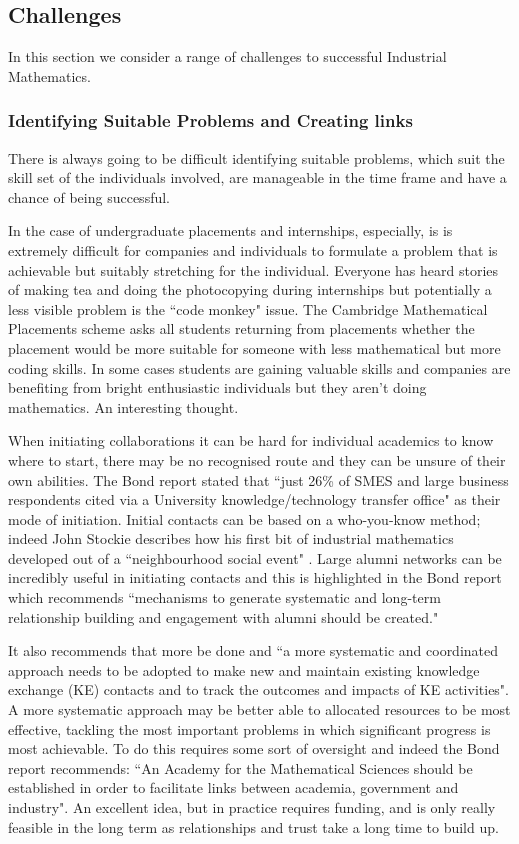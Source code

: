 \documentclass[11pt]{article} %
\begin{document}
	\subsection{Challenges \label{challenges}} 
	In this section we consider a range of challenges to successful Industrial Mathematics. 
	
	\subsubsection{Identifying Suitable Problems and Creating links} 
	
	There is always going to be difficult identifying suitable problems, which suit the skill set of the individuals involved, are manageable in the time frame and have a chance of being successful. 
	
	In the case of undergraduate placements and internships, especially,  is is extremely difficult for companies and individuals  to formulate a problem that is achievable but suitably stretching for the individual. Everyone has heard stories of making tea and doing the photocopying during internships but potentially a less visible problem is the ``code monkey" issue. The Cambridge Mathematical Placements scheme asks all students returning from placements whether the placement would be more suitable for someone with less mathematical but more coding skills. In some cases students are gaining valuable skills and companies are benefiting from bright enthusiastic individuals but they aren't doing mathematics. An interesting thought. 
	
	
	
	When initiating collaborations it can be hard for individual academics to know where to start, there may be  no recognised route and they can be  unsure of their own abilities.	The Bond report stated that ``just 26\% of SMES and large business respondents cited via a University knowledge/technology transfer office" as their mode of initiation. Initial contacts can be based on a who-you-know  method; indeed John Stockie describes how his first bit of industrial mathematics developed out of a  ``neighbourhood social event" \cite{Stockie2015}. Large alumni networks can be incredibly useful in initiating contacts and this is highlighted in the Bond report \cite{Bond}  which recommends ``mechanisms to generate systematic and long-term relationship building and engagement with alumni should be created."
	
	It also recommends that more be done  and ``a more systematic and coordinated approach needs to be adopted to make new and maintain existing knowledge exchange (KE) contacts and to track the outcomes and impacts of KE activities". A more systematic approach may be better able to allocated resources to be most effective, tackling the most important problems in which significant progress is most achievable. To do this requires some sort of oversight and indeed the Bond report recommends: ``An Academy for the Mathematical Sciences should be established in order to facilitate links between academia, government and industry". An excellent idea, but in practice requires funding, and is only really feasible in the long term as relationships and trust take a long time to build up. 
	
\end{document}
